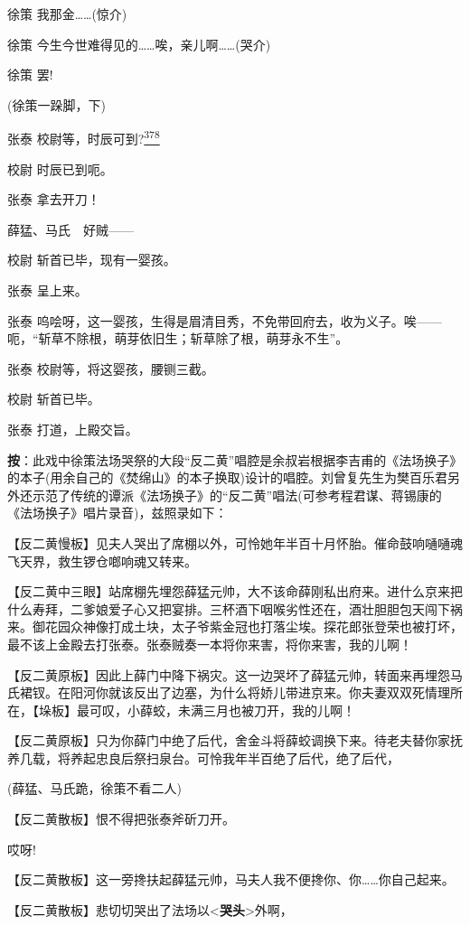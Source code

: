 徐策 我那金\ldots{}\ldots{}(惊介)

徐策 今生今世难得见的\ldots{}\ldots{}唉，亲儿啊\ldots{}\ldots{}(哭介)

徐策 罢!

(徐策一跺脚，下)

张泰 校尉等，时辰可到?\protect\hyperlink{fn378}{\textsuperscript{378}}

校尉 时辰已到呃。

张泰 拿去开刀！

薛猛、马氏　好贼------

校尉 斩首已毕，现有一婴孩。

张泰 呈上来。

张泰
呜哙呀，这一婴孩，生得是眉清目秀，不免带回府去，收为义子。唉------呃，``斩草不除根，萌芽依旧生；斩草除了根，萌芽永不生''。

张泰 校尉等，将这婴孩，腰铡三截。

校尉 斩首已毕。

张泰 打道，上殿交旨。

\textbf{按}：此戏中徐策法场哭祭的大段``反二黄''唱腔是余叔岩根据李吉甫的《法场换子》的本子(用余自己的《焚绵山》的本子换取)设计的唱腔。刘曾复先生为樊百乐君另外还示范了传统的谭派《法场换子》的``反二黄''唱法(可参考程君谋、蒋锡康的《法场换子》唱片录音)，兹照录如下：

【反二黄慢板】见夫人哭出了席棚以外，可怜她年半百十月怀胎。催命鼓响嗵嗵魂飞天界，救生锣仓啷响魂又转来。

【反二黄中三眼】站席棚先埋怨薛猛元帅，大不该命薛刚私出府来。进什么京来把什么寿拜，二爹娘爱子心又把宴排。三杯酒下咽喉劣性还在，酒壮胆胆包天闯下祸来。御花园众神像打成土块，太子爷紫金冠也打落尘埃。探花郎张登荣也被打坏，最不该上金殿去打张泰。张泰贼奏一本将你来害，将你来害，我的儿啊！

【反二黄原板】因此上薛门中降下祸灾。这一边哭坏了薛猛元帅，转面来再埋怨马氏裙钗。在阳河你就该反出了边塞，为什么将娇儿带进京来。你夫妻双双死情理所在，【垛板】最可叹，小薛蛟，未满三月也被刀开，我的儿啊！

【反二黄原板】只为你薛门中绝了后代，舍金斗将薛蛟调换下来。待老夫替你家抚养几载，将养起忠良后祭扫泉台。可怜我年半百绝了后代，绝了后代，

(薛猛、马氏跪，徐策不看二人)

【反二黄散板】恨不得把张泰斧斫刀开。

哎呀!

【反二黄散板】这一旁搀扶起薛猛元帅，马夫人我不便搀你、你\ldots{}\ldots{}你自己起来。

【反二黄散板】悲切切哭出了法场以\textless{}\textbf{哭头}\textgreater{}外啊，


